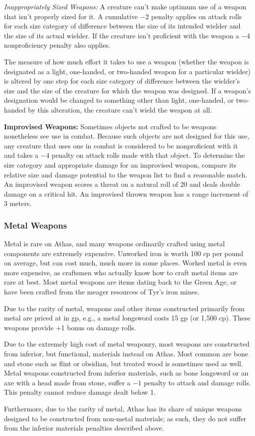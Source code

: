 \textit{Inappropriately Sized Weapons:} A creature can't make optimum use of a weapon that isn't properly sized for it. A cumulative $-2$ penalty applies on attack rolls for each size category of difference between the size of its intended wielder and the size of its actual wielder. If the creature isn't proficient with the weapon a $-4$ nonproficiency penalty also applies.

The measure of how much effort it takes to use a weapon (whether the weapon is designated as a light, one-handed, or two-handed weapon for a particular wielder) is altered by one step for each size category of difference between the wielder's size and the size of the creature for which the weapon was designed. If a weapon's designation would be changed to something other than light, one-handed, or two-handed by this alteration, the creature can't wield the weapon at all.

\textbf{Improvised Weapons:} Sometimes objects not crafted to be weapons nonetheless see use in combat. Because such objects are not designed for this use, any creature that uses one in combat is considered to be nonproficient with it and takes a $-4$ penalty on attack rolls made with that object. To determine the size category and appropriate damage for an improvised weapon, compare its relative size and damage potential to the weapon list to find a reasonable match. An improvised weapon scores a threat on a natural roll of 20 and deals double damage on a critical hit. An improvised thrown weapon has a range increment of 3 meters.

\subsubsection{Metal Weapons}
Metal is rare on Athas, and many weapons ordinarily crafted using metal components are extremely expensive. Unworked iron is worth 100 cp per pound on average, but can cost much, much more in some places. Worked metal is even more expensive, as craftsmen who actually know how to craft metal items are rare at best. Most metal weapons are items dating back to the Green Age, or have been crafted from the meager resources of Tyr's iron mines.

Due to the rarity of metal, weapons and other items constructed primarily from metal are priced at in gp, e.g., a metal longsword costs 15 gp (or 1,500 cp). These weapons provide +1 bonus on damage rolls.

Due to the extremely high cost of metal weaponry, most weapons are constructed from inferior, but functional, materials instead on Athas. Most common are bone and stone such as flint or obsidian, but treated wood is sometimes used as well. Metal weapons constructed from inferior materials, such as bone longsword or an axe with a head made from stone, suffer a $-1$ penalty to attack and damage rolls. This penalty cannot reduce damage dealt below 1.

Furthermore, due to the rarity of metal, Athas has its share of unique weapons designed to be constructed from non-metal materials; as such, they do not suffer from the inferior materials penalties described above.